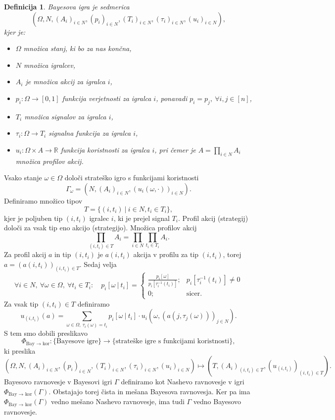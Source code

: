\documentclass[10pt, a4paper]{article}
\newtheorem{defi}[izr]{Definicija}
\newenvironment{noticeB}{%
  \tcolorbox[%
  notitle,
  empty,
  enhanced,  %
  breakable,
  coltext=black,
  colback=white, 
  fontupper=\rmfamily,
  noparskip,
  sharp corners,
  boxrule=-1pt,  %
  frame hidden,
  left=7pt,  %
  right=7pt,
  top=5pt,
  bottom=5pt,
  before skip=2.5ex plus 2pt,
  after skip=2.5ex plus 2pt,
  borderline west = {1.5pt}{-0.1pt}{blue!30!black}, %
  overlay unbroken and last={%
    \draw[color=black, line width=1.25pt]
    ($(frame.south west)+(1.pt, -0.1pt)$) -- ++(2em, 0);
  }
  ]}
{\endtcolorbox}
\newenvironment{definicija}{\begin{noticeB}\begin{defi}}{%
    \end{defi}\end{noticeB}}
\newcommand{\R}{\mathbb {R}}
\begin{document}
\begin{definicija}
  Bayesova igra je sedmerica 
  $$(\Omega, N, (A_i)_{i \in N}, (p_i)_{i \in N}, (T_i)_{i \in N}, (\tau_i)_{i \in N}, (u_i)_{i \in N}),$$
  kjer je:
  \begin{itemize}
    \item $\Omega$ množica stanj, ki bo za nas končna,
    \item $N$ množica igralcev,
    \item $A_i$ je množica akcij za igralca $i$,
    \item $p_i: \Omega \to [0, 1]$ funkcija verjetnosti za igralca $i$, ponavadi $p_i = p_j,\ \forall i, j \in [n]$,
    \item $T_i$ množica signalov za igralca $i$,
    \item $\tau_i: \Omega \to T_i$ signalna funkcija za igralca $i$,
    \item $u_i: \Omega \times A \to \R$ funkcija koristnosti za igralca $i$, pri čemer je $A = \prod_{i \in N} A_i$ množica profilov akcij.
  \end{itemize}
\end{definicija}

Vsako stanje $\omega \in \Omega$ določi strateško igro s funkcijami koristnosti 
$$\Gamma_\omega = (N, (A_i)_{i \in N}, (u_i(\omega, \cdot))_{i \in N}).$$
Definiramo množico tipov 
$$T = \{(i, t_i)\ \big|\ i \in N, t_i \in T_i\},$$
kjer je poljuben tip $(i, t_i)$ igralec $i$, ki je prejel signal $T_i$.
Profil akcij (strategij) določi za vsak tip eno akcijo (strategijo).
Množica profilov akcij  
$$\prod_{(i, t_i) \in T} A_i = \prod_{i \in N} \prod_{t_i \in T_i} A_i.$$
Za profil akcij $a$ in tip $(i, t_i)$ je $a(i, t_i)$ akcija v profilu za tip $(i, t_i)$,
torej $a = (a(i, t_i))_{(i, t_i) \in T}$. Sedaj velja 
$$\forall i \in N,\ \forall \omega \in \Omega,\ \forall t_i \in T_i:\quad p_i [\omega\ |\ t_i] = \begin{cases}
  \frac{p_i[\omega]}{p_i[\tau_i ^{-1} (t_i)]};& p_i[\tau_i ^{-1} (t_i)] \neq 0\\
  0;&\mathrm{sicer}.
\end{cases}$$
Za vsak tip $(i, t_i) \in T$ definiramo  
$$u_{(i, t_i)} (a) = \sum_{\omega \in \Omega,\ \tau_i(\omega) = t_i} p_i [\omega\ |\ t_i] \cdot u_i(\omega, (a(j, \tau_j(\omega)))_{j \in N}).$$
S tem smo dobili preslikavo 
$$\Phi_{\text{Bay $\to$ kor}}: \{\text{Bayesove igre}\} \to \{\text{strateške igre s funkcijami koristnosti}\},$$
ki preslika 
$$(\Omega, N, (A_i)_{i \in N}, (p_i)_{i \in N}, (T_i)_{i \in N}, (\tau_i)_{i \in N}, (u_i)_{i \in N}) \mapsto (T, (A_i)_{(i, t_i) \in T}, (u_{(i, t_i)})_{(i, t_i) \in T}).$$
Bayesovo ravnovesje v Bayesovi igri $\Gamma$ definiramo kot Nashevo ravnovesje v igri $\Phi_{\text{Bay $\to$ kor}}(\Gamma)$.
Obstajajo torej čista in mešana Bayesova ravnovesja. Ker pa ima $\Phi_{\text{Bay $\to$ kor}}(\Gamma)$ vedno mešano Nashevo ravnovesje, 
ima tudi $\Gamma$ vedno Bayesovo ravnovesje.
\end{document}
